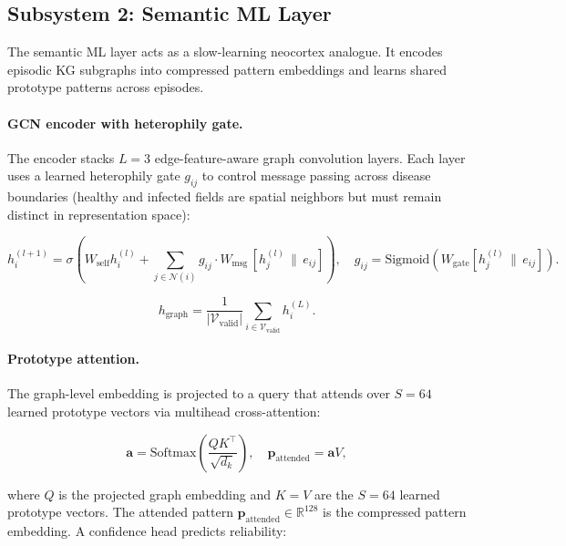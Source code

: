 \documentclass{article}
\begin{document}
\subsection{Subsystem 2: Semantic ML Layer}

The semantic ML layer acts as a slow-learning neocortex analogue. It encodes
episodic KG subgraphs into compressed pattern embeddings and learns shared
prototype patterns across episodes.

\paragraph{GCN encoder with heterophily gate.}
The encoder stacks $L = 3$ edge-feature-aware graph convolution layers. Each layer
uses a learned heterophily gate $g_{ij}$ to control message passing across disease
boundaries (healthy and infected fields are spatial neighbors but must remain
distinct in representation space):

\begin{equation}
h_i^{(l+1)} = \sigma\!\left( W_{\text{self}} h_i^{(l)} +
\sum_{j \in \mathcal{N}(i)} g_{ij} \cdot W_{\text{msg}} \,[h_j^{(l)} \,\|\, e_{ij}]
\right),\quad
g_{ij} = \text{Sigmoid}(W_{\text{gate}} [h_j^{(l)} \,\|\, e_{ij}]).
\label{eq:gcn}
\end{equation}

\begin{equation}
h_{\text{graph}} = \frac{1}{|\mathcal{V}_{\text{valid}}|}
\sum_{i \in \mathcal{V}_{\text{valid}}} h_i^{(L)}.
\label{eq:pool}
\end{equation}

\paragraph{Prototype attention.}
The graph-level embedding is projected to a query that attends over $S=64$ learned
prototype vectors via multihead cross-attention:

\begin{equation}
\mathbf{a} = \text{Softmax}\!\left( \frac{Q K^\top}{\sqrt{d_k}} \right),\quad
\mathbf{p}_{\text{attended}} = \mathbf{a} V,
\label{eq:prototype}
\end{equation}

where $Q$ is the projected graph embedding and $K = V$ are the $S=64$ learned
prototype vectors. The attended pattern $\mathbf{p}_{\text{attended}} \in
\mathbb{R}^{128}$ is the compressed pattern embedding. A confidence head predicts
reliability:
\end{document}
